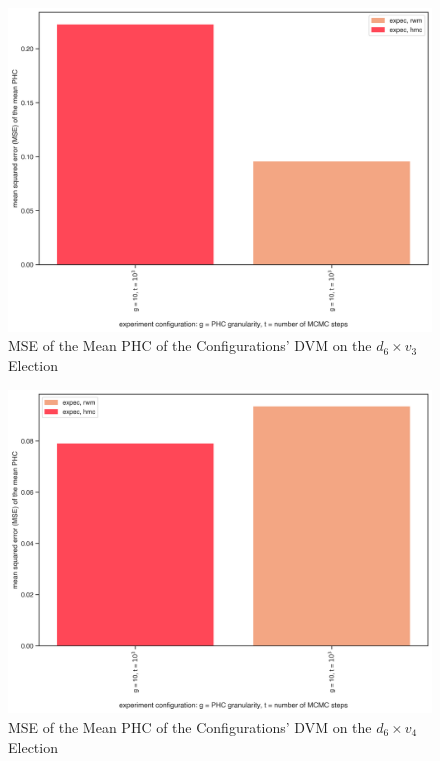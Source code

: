 \begin{figure}[ht]\centering
 \includegraphics[width=0.75\linewidth]{figures/6_3_mean_mse.png}
 \caption{MSE of the Mean PHC of the Configurations' DVM on the $d_6 \times v_3$ Election}
 \label{fig:6_3_mean_mse}
\end{figure}

\begin{figure}[ht]\centering
 \includegraphics[width=0.75\linewidth]{figures/6_4_mean_mse.png}
 \caption{MSE of the Mean PHC of the Configurations' DVM on the $d_6 \times v_4$ Election}
 \label{fig:6_4_mean_mse}
\end{figure}

